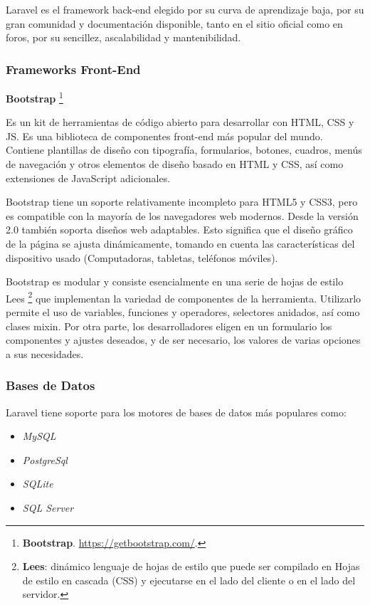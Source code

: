\documentclass[11pt,oneside]{book}
\begin{document}
Laravel es el framework back-end elegido por su curva de aprendizaje baja, por su gran comunidad y documentación disponible, tanto en el sitio oficial como en foros, por su sencillez, ascalabilidad y mantenibilidad.

\newpage
\subsubsection{Frameworks Front-End}
\textbf{Bootstrap} \footnote{\textbf{Bootstrap}. \url{https://getbootstrap.com/}.}

Es un kit de herramientas de código abierto para desarrollar con HTML, CSS y JS. Es una biblioteca de componentes front-end más popular del mundo. Contiene plantillas de diseño con tipografía, formularios, botones, cuadros, menús de navegación y otros elementos de diseño basado en HTML y CSS, así como extensiones de JavaScript adicionales.

Bootstrap tiene un soporte relativamente incompleto para HTML5 y CSS3, pero es compatible con la mayoría de los navegadores web modernos. Desde la versión 2.0 también soporta diseños web adaptables. Esto significa que el diseño gráfico de la página se ajusta dinámicamente, tomando en cuenta las características del dispositivo usado (Computadoras, tabletas, teléfonos móviles).

Bootstrap es modular y consiste esencialmente en una serie de hojas de estilo Lees \footnote{\textbf{Lees}: dinámico lenguaje de hojas de estilo que puede ser compilado en Hojas de estilo en cascada (CSS) y ejecutarse en el lado del cliente o en el lado del servidor.} que implementan la variedad de componentes de la herramienta. Utilizarlo permite el uso de variables, funciones y operadores, selectores anidados, así como clases mixin. Por otra parte, los desarrolladores eligen en un formulario los componentes y ajustes deseados, y de ser necesario, los valores de varias opciones a sus necesidades.

\subsubsection{Bases de Datos}
Laravel tiene soporte para los motores de bases de datos más populares como:
\begin{itemize}
\item \textit{MySQL}
\item \textit{PostgreSql}
\item \textit{SQLite}
\item \textit{SQL Server}
\end{itemize}
\end{document}

